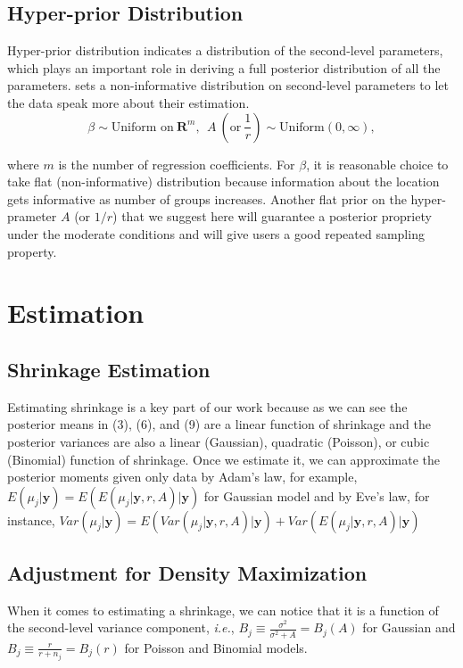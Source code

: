 \documentclass[article]{jss}
\begin{document}
\subsection[Hyper-prior Distribution]{Hyper-prior Distribution}
Hyper-prior distribution indicates a distribution of the second-level parameters, which plays an important role in deriving a full posterior distribution of all the parameters.  sets a non-informative distribution on second-level parameters to let the data speak more about their estimation.
\begin{equation}
\beta \sim \textrm{Uniform on}~ \mathbf{R}^{m},~~A ~(\textrm{or}~ \frac{1}{r})\sim \textrm{Uniform}(0, \infty),
\end{equation}

where $m$ is the number of regression coefficients. For $\beta$, it is reasonable choice to take flat (non-informative) distribution because information about the location gets informative as number of groups increases. Another flat prior on the hyper-prameter $A$ (or $1/r$) that we suggest here will guarantee a posterior propriety under the moderate conditions and will give users a good repeated sampling property.
\\



\section[Estimation]{Estimation}
\subsection[Shrinkage Estimation]{Shrinkage Estimation}
Estimating shrinkage is a key part of our work because as we can see the posterior means in (3), (6), and (9) are a linear function of shrinkage and the posterior variances are also a linear (Gaussian), quadratic (Poisson), or cubic (Binomial) function of shrinkage. Once we estimate it, we can approximate the posterior moments given only data by Adam's law, for example, $E(\mu_{j}\vert \textbf{y})=E(E(\mu_{j}\vert \textbf{y}, r, A)\vert \textbf{y})$ for Gaussian model and by Eve's law, for instance, $Var(\mu_{j}\vert \textbf{y})=E(Var(\mu_{j}\vert \textbf{y}, r, A)\vert \textbf{y})+Var(E(\mu_{j}\vert \textbf{y}, r, A)\vert \textbf{y})$
\subsection[ADM]{Adjustment for Density Maximization}
When it comes to estimating a shrinkage, we can notice that it is a function of the second-level variance component, \emph{i.e.}, $B_{j}\equiv\frac{\sigma^{2}}{\sigma^{2}+A}=B_{j}(A)$ for Gaussian and $B_{j}\equiv\frac{r}{r+n_{j}}=B_{j}(r)$ for Poisson and Binomial models.
\\
\end{document}
